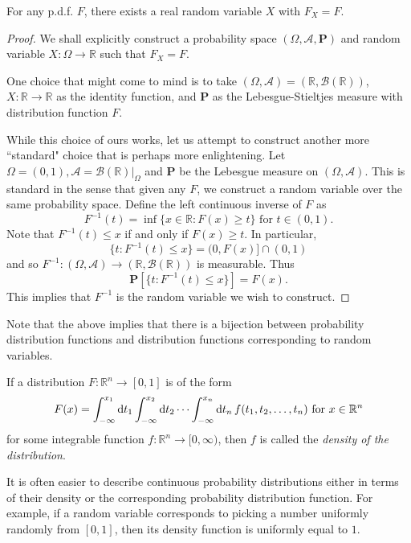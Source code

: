 \begin{theorem}
    For any p.d.f. $F$, there exists a real random variable $X$ with $F_X=F$.
\end{theorem}

\begin{proof}
    We shall explicitly construct a probability space $(\Omega,\mathcal{A},\textbf{P})$ and random variable $X:\Omega\to\mathbb{R}$ such that $F_X=F$.
    
    \vspace{1mm}
    One choice that might come to mind is to take $(\Omega,\mathcal{A}) = (\mathbb{R},\mathcal{B}(\mathbb{R}))$, $X:\mathbb{R}\to\mathbb{R}$ as the identity function, and $\textbf{P}$ as the Lebesgue-Stieltjes measure with distribution function $F$.
    
    \vspace{1.5mm}
    While this choice of ours works, let us attempt to construct another more ``standard" choice that is perhaps more enlightening. Let $\Omega=(0,1),\mathcal{A}=\left.\mathcal{B}(\mathbb{R})\right|_\Omega$ and $\textbf{P}$ be the Lebesgue measure on $(\Omega,\mathcal{A})$. This is standard in the sense that given any $F$, we construct a random variable over the same probability space. Define the left continuous inverse of $F$ as
    $$F^{-1}(t)=\inf\{x\in\mathbb{R}:F(x)\geq t\}\text{ for }t\in (0,1).$$
    Note that $F^{-1}(t)\leq x$ if and only if $F(x)\geq t$.
    In particular,
    $$\{t:F^{-1}(t)\leq x\}=(0,F(x)]\cap(0,1)$$
    and so $F^{-1}:(\Omega,\mathcal{A})\to(\mathbb{R},\mathcal{B}(\mathbb{R}))$ is measurable. Thus
    $$\textbf{P}\left[\{t:F^{-1}(t)\leq x\}\right]=F(x).$$
    This implies that $F^{-1}$ is the random variable we wish to construct.
\end{proof}

Note that the above implies that there is a bijection between probability distribution functions and distribution functions corresponding to random variables.

\begin{definition}
    If a distribution $F:\mathbb{R}^n\to[0,1]$ is of the form
    $$F(x)=\int_{-\infty}^{x_1}\operatorname{d}\!{t_1}\int_{-\infty}^{x_2}\operatorname{d}\!{t_2}\cdots\int_{-\infty}^{x_n}\operatorname{d}\!{t_n}\, f(t_1,t_2,\ldots,t_n)\text{ for }x\in\mathbb{R}^n$$
    for some integrable function $f:\mathbb{R}^n\to[0,\infty)$, then $f$ is called the \textit{density of the distribution}.
\end{definition}

It is often easier to describe continuous probability distributions either in terms of their density or the corresponding probability distribution function. For example, if a random variable corresponds to picking a number uniformly randomly from $[0,1]$, then its density function is uniformly equal to $1$.

